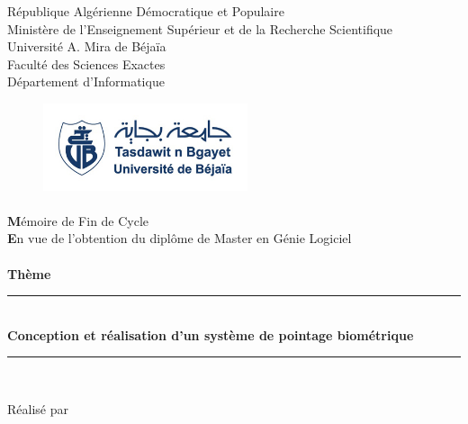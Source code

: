 
\begin{titlepage}

    \begin{center}

        \large{République Algérienne Démocratique et Populaire}\\
        \large{Ministère de l'Enseignement Supérieur et de la Recherche Scientifique}\\
        \large{Université A. Mira de Béjaïa}\\
        \large{Faculté des Sciences Exactes}\\
        \large{Département d'Informatique}\\


        \begin{figure}[h!]
            \centering
            \includegraphics[width=6cm]{images/logo.jpg}
        \end{figure}

        \paragraph{}
        {\LARGE{\textbf Mémoire de Fin de Cycle}} \\[2ex]
        \textbf En vue de l'obtention du diplôme de Master en Génie Logiciel \\[1ex]
        \paragraph{}

        \textbf{Thème}\\[1ex]
        \rule{18cm}{1pt}
        {\Huge{\textbf{{\\
        Conception et réalisation d'un système de pointage biométrique \\}}}}
        \rule{18cm}{1pt}\\
        \vspace{0.2cm}

    \end{center}

    \begin{center}
        \large Réalisé par

\end{center}
\end{titlepage}
